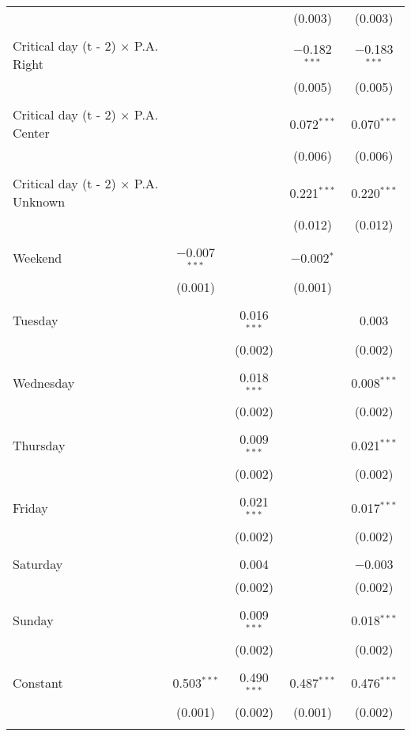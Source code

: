 \documentclass[
]{article}
\begin{document}
\begin{table}[!htbp]
{\begin{tabular}{@{\extracolsep{5pt}}lcccc}
  &  &  & (0.003) & (0.003) \\ 
  & & & & \\ 
 Critical day (t - 2) $\times$ P.A. Right &  &  & $-$0.182$^{***}$ & $-$0.183$^{***}$ \\ 
  &  &  & (0.005) & (0.005) \\ 
  & & & & \\ 
 Critical day (t - 2) $\times$ P.A. Center &  &  & 0.072$^{***}$ & 0.070$^{***}$ \\ 
  &  &  & (0.006) & (0.006) \\ 
  & & & & \\ 
 Critical day (t - 2) $\times$ P.A. Unknown &  &  & 0.221$^{***}$ & 0.220$^{***}$ \\ 
  &  &  & (0.012) & (0.012) \\ 
  & & & & \\ 
 Weekend & $-$0.007$^{***}$ &  & $-$0.002$^{*}$ &  \\ 
  & (0.001) &  & (0.001) &  \\ 
  & & & & \\ 
 Tuesday &  & 0.016$^{***}$ &  & 0.003 \\ 
  &  & (0.002) &  & (0.002) \\ 
  & & & & \\ 
 Wednesday &  & 0.018$^{***}$ &  & 0.008$^{***}$ \\ 
  &  & (0.002) &  & (0.002) \\ 
  & & & & \\ 
 Thursday &  & 0.009$^{***}$ &  & 0.021$^{***}$ \\ 
  &  & (0.002) &  & (0.002) \\ 
  & & & & \\ 
 Friday &  & 0.021$^{***}$ &  & 0.017$^{***}$ \\ 
  &  & (0.002) &  & (0.002) \\ 
  & & & & \\ 
 Saturday &  & 0.004 &  & $-$0.003 \\ 
  &  & (0.002) &  & (0.002) \\ 
  & & & & \\ 
 Sunday &  & 0.009$^{***}$ &  & 0.018$^{***}$ \\ 
  &  & (0.002) &  & (0.002) \\ 
  & & & & \\ 
 Constant & 0.503$^{***}$ & 0.490$^{***}$ & 0.487$^{***}$ & 0.476$^{***}$ \\ 
  & (0.001) & (0.002) & (0.001) & (0.002) \\ 
  & & & & \\ 

\end{tabular}}
\end{table}
\end{document}

